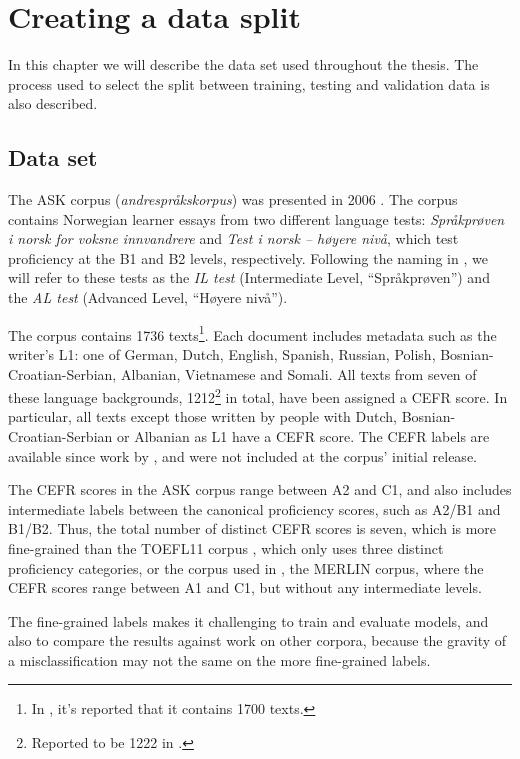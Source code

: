 \chapter{Creating a data split}

In this chapter we will describe the data set used throughout the thesis. The
process used to select the split between training, testing and validation
data is also described.

\section{Data set}

The ASK corpus (\emph{andrespråkskorpus}) was presented in 2006
\autocite{tenfjord06}. The corpus contains Norwegian learner essays from two
different language tests: \emph{Språkprøven i norsk for voksne innvandrere}
and \emph{Test i norsk – høyere nivå}, which test proficiency at the B1 and
B2 levels, respectively. Following the naming in
\textcite{carlsen2012proficiency}, we will refer to these tests as the
\emph{IL test} (Intermediate Level, ``Språkprøven'') and the \emph{AL test}
(Advanced Level, ``Høyere nivå'').

The corpus contains 1736 texts\footnote{In
\textcite{carlsen2012proficiency,malmasi15,malmasi17}, it's reported that it
contains 1700 texts.}. Each document includes metadata such as the writer's
L1: one of German, Dutch, English, Spanish, Russian, Polish,
Bosnian-Croatian-Serbian, Albanian, Vietnamese and Somali. All texts from
seven of these language backgrounds, 1212\footnote{Reported to be 1222 in
\textcite{carlsen2012proficiency}.} in total, have been assigned a CEFR
score. In particular, all texts except those written by people with Dutch,
Bosnian-Croatian-Serbian or Albanian as L1 have a CEFR score. The CEFR labels
are available since work by \textcite{carlsen2012proficiency}, and were not
included at the corpus' initial release.

The CEFR scores in the ASK corpus range between A2 and C1, and also includes
intermediate labels between the canonical proficiency scores, such as A2/B1
and B1/B2. Thus, the total number of distinct CEFR scores is seven, which is
more fine-grained than the TOEFL11 corpus \autocite{blanchard13}, which only
uses three distinct proficiency categories, or the corpus used in
\textcite{vajjala18universalCEFR}, the MERLIN corpus, where the CEFR scores
range between A1 and C1, but without any intermediate levels.

The fine-grained labels makes it challenging to train and evaluate models,
and also to compare the results against work on other corpora, because the
gravity of a misclassification may not the same on the more fine-grained
labels.

